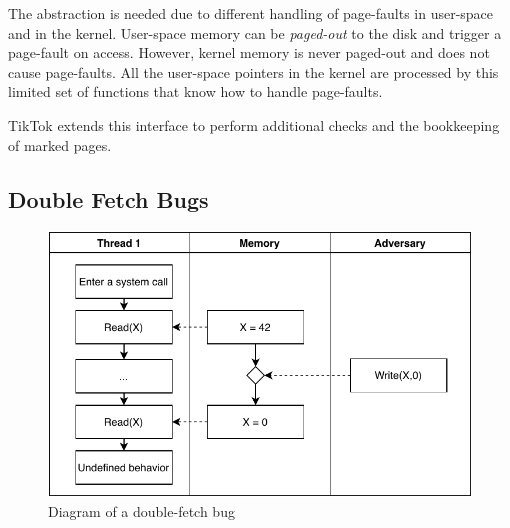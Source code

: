 \documentclass[conference]{IEEEtran}
\newcommand{\sysname}{TikTok}
\begin{document}
The abstraction is needed due to different handling of page-faults in user-space
and in the kernel. User-space memory can be \emph{paged-out} to the disk and
trigger a page-fault on access. However, kernel memory is never paged-out and
does not cause page-faults. All the user-space pointers in the kernel are
processed by this limited set of functions that know how to handle page-faults.

\sysname{} extends this interface to perform additional checks and the bookkeeping
of marked pages.

\subsection{Double Fetch Bugs}
\label{subsec:doublefetch}

\begin{figure}[]
  \centering
  \includegraphics[width=.85\linewidth]{img/doublefetch.pdf}
  \caption{Diagram of a double-fetch bug}
  \label{fig:doublefetch}
\end{figure}
\end{document}
